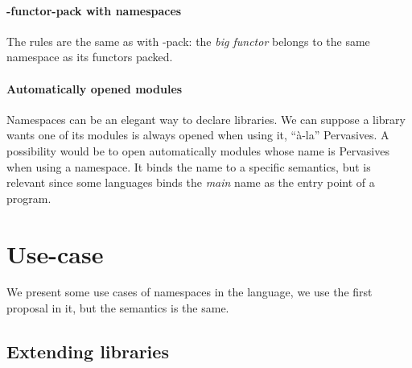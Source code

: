 \paragraph{-functor-pack with namespaces}

The rules are the same as with -pack: the \emph{big functor} belongs to the same
namespace as its functors packed.

\paragraph{Automatically opened modules}

Namespaces can be an elegant way to declare libraries. We can suppose a library
wants one of its modules is always opened when using it, ``à-la''
Pervasives. A possibility would be to open automatically modules whose name is
Pervasives when using a namespace. It binds the name to a specific semantics,
but is relevant since some languages binds the \emph{main} name as the entry
point of a program.



\section{Use-case}

We present some use cases of namespaces in the language, we use the first
proposal in it, but the semantics is the same.


\subsection{Extending libraries}

